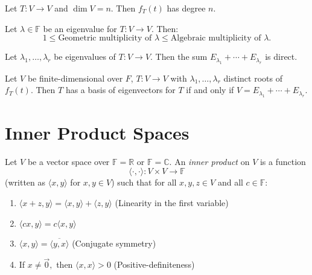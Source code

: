 \documentclass{article}
\newcommand{\R}{\mathbb{R}}
\newcommand{\C}{\mathbb{C}}
\newcommand{\F}{\mathbb{F}}
\newcommand{\secbreak}{\noindent \hrulefill \vspace{1cm}}
\begin{document}
\begin{lemma}[A]
Let \( T: V \to V \) and \(\dim V = n\). Then \( f_T(t) \) has degree \( n \).

Let \( \lambda \in \mathbb{F} \) be an eigenvalue for \( T: V \to V \). Then:
\[
1 \leq \text{Geometric multiplicity of } \lambda \leq \text{Algebraic multiplicity of } \lambda.
\]
\end{lemma}

\begin{lemma}[B]
Let \( \lambda_1, \ldots, \lambda_r \) be eigenvalues of \( T : V \to V \). Then the sum \( E_{\lambda_1} + \cdots + E_{\lambda_r} \) is direct.
\end{lemma}

\begin{lemma}[C]
Let \( V \) be finite-dimensional over \( F \), \( T : V \to V \) with \( \lambda_1, \ldots, \lambda_r \) distinct roots of \( f_T(t) \). Then \( T \) has a basis of eigenvectors for \( T \) if and only if \( V = E_{\lambda_1} + \cdots + E_{\lambda_r} \).
\end{lemma}



\secbreak


\section{Inner Product Spaces}

\begin{definition}
    Let \( V \) be a vector space over \( \F = \R \) or \( \F = \C \). An \emph{inner product} on \( V \) is a function
    \[
    \langle \cdot , \cdot \rangle : V \times V \to \F
    \]
    (written as \(\langle x, y \rangle\) for \( x, y \in V \)) such that for all \( x, y, z \in V \) and all \( c \in \F \):
    \begin{enumerate}[label=(\alph*)]
        \item \(\langle x + z, y \rangle = \langle x, y \rangle + \langle z, y \rangle\) \quad (Linearity in the first variable)
        \item \(\langle cx, y \rangle = c \langle x, y \rangle\)
        \item \(\langle x, y \rangle = \overline{\langle y, x \rangle}\) \quad (Conjugate symmetry)
        \item If \( x \neq \vec{0}, \) then \( \langle x, x \rangle > 0 \) \quad (Positive-definiteness)
    \end{enumerate}
\end{definition}
\end{document}
